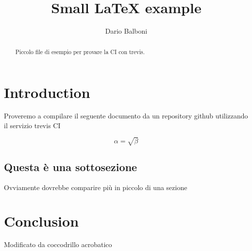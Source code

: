 \documentclass{article}
\begin{document}
	\title{Small \LaTeX{} example}
	\author{Dario Balboni}
	\maketitle

	\begin{abstract}
		Piccolo file di esempio per provare la CI con trevis.
	\end{abstract}

	\section{Introduction}
		Proveremo a compilare il seguente documento da un repository
		github utilizzando il servizio trevis CI

	\begin{equation}
	    \label{dummy_equation}
	    \alpha = \sqrt{ \beta }
	\end{equation}

	\subsection{Questa è una sottosezione}
		Ovviamente dovrebbe comparire più in piccolo di una sezione

	\section{Conclusion}
		Modificato da coccodrillo acrobatico
\end{document}
